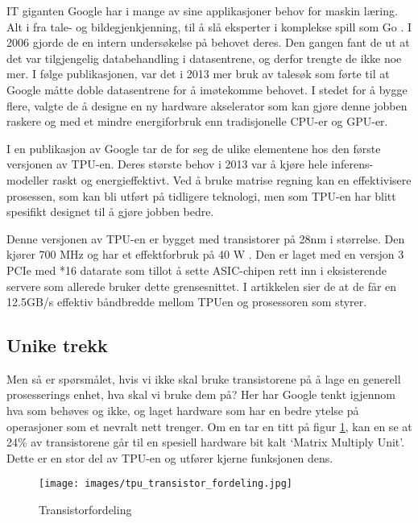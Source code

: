 IT giganten Google har i mange av sine applikasjoner behov for maskin læring. Alt i fra tale- og bildegjenkjenning, til å slå eksperter i komplekse spill som \newline Go \cite{look_at_TPU}. I 2006 gjorde de en intern undersøkelse på behovet deres. Den gangen fant de ut at det var tilgjengelig databehandling i datasentrene, og derfor trengte de ikke noe mer. I følge publikasjonen, var det i 2013 mer bruk av talesøk som førte til at Google måtte doble datasentrene for å imøtekomme behovet. I stedet for å bygge flere, valgte de å designe en ny hardware akselerator som kan gjøre denne jobben raskere og med et mindre energiforbruk enn tradisjonelle CPU-er og GPU-er.

I en publikasjon av Google \cite{tpu_main} tar de for seg de ulike elementene hos den første versjonen av TPU-en. Deres største behov i 2013 var å kjøre hele inferens-modeller raskt og energieffektivt. Ved å bruke matrise regning kan en effektivisere prosessen, som kan bli utført på tidligere teknologi, men som TPU-en har blitt spesifikt designet til å gjøre jobben bedre.

Denne versjonen av TPU-en er bygget med transistorer på 28nm i størrelse. Den kjører 700 MHz og har et effektforbruk på 40 W \cite{tpu_main}. Den er laget med en versjon 3 PCIe med *16 datarate som tillot å sette ASIC-chipen rett inn i eksisterende servere som allerede bruker dette grensesnittet. I artikkelen sier de at de får en 12.5GB/s effektiv båndbredde mellom TPUen og prosessoren som styrer.
 
\subsection{Unike trekk}
Men så er spørsmålet, hvis vi ikke skal bruke transistorene på å lage en generell prosesserings enhet, hva skal vi bruke dem på? Her har Google tenkt igjennom hva som behøves og ikke, og laget hardware som har en bedre ytelse på operasjoner som et nevralt nett trenger. Om en tar en titt på figur \ref{fig:transistor}, kan en se at 24\% av transistorene går til en spesiell hardware bit kalt ‘Matrix Multiply Unit’. Dette er en stor del av TPU-en og utfører kjerne funksjonen dens.

\begin{figure}[ht]
    \centering
    \texttt{[image: images/tpu\_transistor\_fordeling.jpg]}
    \caption{Transistorfordeling}
    \label{fig:transistor}
\end{figure}
 
